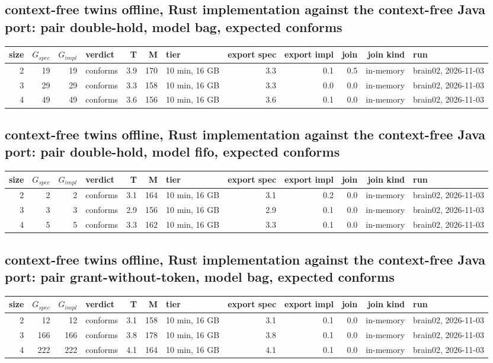 \documentclass[10pt]{article}
\begin{document}
\subsection*{context-free twins offline, Rust implementation against the context-free Java port: pair \textsf{double-hold}, model bag, expected conforms}
\begin{longtable}{@{}rrrlrrlrrrrl@{}}
\toprule
size & $G_{\mathit{spec}}$ & $G_{\mathit{impl}}$ & verdict & T & M & tier & export spec & export impl & join & join kind & run \\
\midrule
\endhead
\color{red} 2 & 19 & 19 & conforms & 3.9 & 170 & 10 min, 16 GB & 3.3 & 0.1 & 0.5 & in-memory & brain02, 2026-11-03 \\
\color{red} 3 & 29 & 29 & conforms & 3.3 & 158 & 10 min, 16 GB & 3.3 & 0.0 & 0.0 & in-memory & brain02, 2026-11-03 \\
\color{red} 4 & 49 & 49 & conforms & 3.6 & 156 & 10 min, 16 GB & 3.6 & 0.1 & 0.0 & in-memory & brain02, 2026-11-03 \\
\bottomrule
\end{longtable}
\subsection*{context-free twins offline, Rust implementation against the context-free Java port: pair \textsf{double-hold}, model fifo, expected conforms}
\begin{longtable}{@{}rrrlrrlrrrrl@{}}
\toprule
size & $G_{\mathit{spec}}$ & $G_{\mathit{impl}}$ & verdict & T & M & tier & export spec & export impl & join & join kind & run \\
\midrule
\endhead
\color{red} 2 & 2 & 2 & conforms & 3.1 & 164 & 10 min, 16 GB & 3.1 & 0.2 & 0.0 & in-memory & brain02, 2026-11-03 \\
\color{red} 3 & 3 & 3 & conforms & 2.9 & 156 & 10 min, 16 GB & 2.9 & 0.1 & 0.0 & in-memory & brain02, 2026-11-03 \\
\color{red} 4 & 5 & 5 & conforms & 3.3 & 162 & 10 min, 16 GB & 3.3 & 0.1 & 0.0 & in-memory & brain02, 2026-11-03 \\
\bottomrule
\end{longtable}
\subsection*{context-free twins offline, Rust implementation against the context-free Java port: pair \textsf{grant-without-token}, model bag, expected conforms}
\begin{longtable}{@{}rrrlrrlrrrrl@{}}
\toprule
size & $G_{\mathit{spec}}$ & $G_{\mathit{impl}}$ & verdict & T & M & tier & export spec & export impl & join & join kind & run \\
\midrule
\endhead
\color{red} 2 & 12 & 12 & conforms & 3.1 & 158 & 10 min, 16 GB & 3.1 & 0.1 & 0.0 & in-memory & brain02, 2026-11-03 \\
\color{red} 3 & 166 & 166 & conforms & 3.8 & 178 & 10 min, 16 GB & 3.8 & 0.1 & 0.0 & in-memory & brain02, 2026-11-03 \\
\color{red} 4 & 222 & 222 & conforms & 4.1 & 164 & 10 min, 16 GB & 4.1 & 0.1 & 0.0 & in-memory & brain02, 2026-11-03 \\
\bottomrule
\end{longtable}
\end{document}
